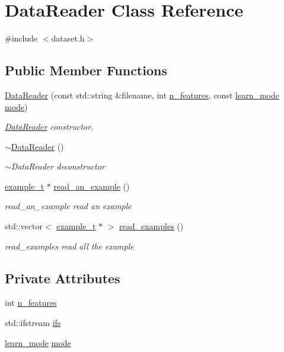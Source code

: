 \hypertarget{class_data_reader}{\section{Data\+Reader Class Reference}
\label{class_data_reader}
}


{\ttfamily \#include $<$dataset.\+h$>$}

\subsection*{Public Member Functions}
\begin{DoxyCompactItemize}
\item 
\hyperlink{class_data_reader_ad4ac7edfbc6771fe1c696ef34d7e79cb}{Data\+Reader} (const std\+::string \&filename, int \hyperlink{class_data_reader_a3d27a389f86383adf1b15d84b5ec5fa7}{n\+\_\+features}, const \hyperlink{dataset_8h_a87dfee910993320c6720931fb701cc41}{learn\+\_\+mode} \hyperlink{class_data_reader_a76f00afd1dd174c2f1ead09b88f5679f}{mode})
\begin{DoxyCompactList}\small\item\em \hyperlink{class_data_reader}{Data\+Reader} constructor. \end{DoxyCompactList}\item 
\hyperlink{class_data_reader_a1fd456f99a9b364953f7973842ea5d25}{$\sim$\+Data\+Reader} ()
\begin{DoxyCompactList}\small\item\em $\sim$\+Data\+Reader deconstructor \end{DoxyCompactList}\item 
\hyperlink{classexample__t}{example\+\_\+t} $\ast$ \hyperlink{class_data_reader_a468abd296a9d085a643241eeb605a316}{read\+\_\+an\+\_\+example} ()
\begin{DoxyCompactList}\small\item\em read\+\_\+an\+\_\+example read an example \end{DoxyCompactList}\item 
std\+::vector$<$ \hyperlink{classexample__t}{example\+\_\+t} $\ast$ $>$ \hyperlink{class_data_reader_afde7816490861599edb7fa2111dd97d3}{read\+\_\+examples} ()
\begin{DoxyCompactList}\small\item\em read\+\_\+examples read all the example \end{DoxyCompactList}\end{DoxyCompactItemize}
\subsection*{Private Attributes}
\begin{DoxyCompactItemize}
\item 
int \hyperlink{class_data_reader_a3d27a389f86383adf1b15d84b5ec5fa7}{n\+\_\+features}
\item 
std\+::ifstream \hyperlink{class_data_reader_abbfd55937610f3cca1d34f21bcbcda0d}{ifs}
\item 
\hyperlink{dataset_8h_a87dfee910993320c6720931fb701cc41}{learn\+\_\+mode} \hyperlink{class_data_reader_a76f00afd1dd174c2f1ead09b88f5679f}{mode}
\end{DoxyCompactItemize}


